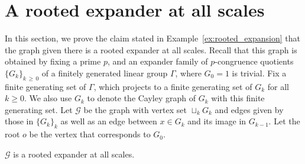 \documentclass[10pt]{amsart}
\theoremstyle{definition}\newtheorem{defi}[theo]{Definition}\newtheorem{rema}[theo]{Remark}\newtheorem{exam}[theo]{Example}\newtheorem{exem}[theo]{Example}\newtheorem{nota}[theo]{Notation}
\newcommand{\calG}{\mathcal{G}}
\begin{document}
\section{A rooted expander at all scales}\label{sec:rooted-expander}

In this section, we prove the claim stated in Example~\ref{ex:rooted_expansion} that the graph given there is a rooted expander at all scales. Recall that this graph is obtained by fixing a prime $p$, and an expander family of $p$-congruence quotients $\{G_k\}_{k\,\geq\,0}$ of a finitely generated linear group $\Gamma$, where $G_0=1$ is trivial. Fix a finite generating set of $\Gamma$, which projects to a finite generating set of $G_k$ for all $k\geq 0$. We also use $G_k$ to denote the Cayley graph of $G_k$ with this finite generating set. Let $\calG$ be the graph with vertex set $\sqcup_k G_k$ and edges given by those in $\{G_k\}_k$ as well as an edge between $x\in G_k$ and its image in $G_{k-1}$. Let the root $o$ be the vertex that corresponds to $G_0$.

\begin{prop}\label{prop:rooted_expansion}
$\calG$ is a rooted expander at all scales.
\end{prop}
\end{document}
